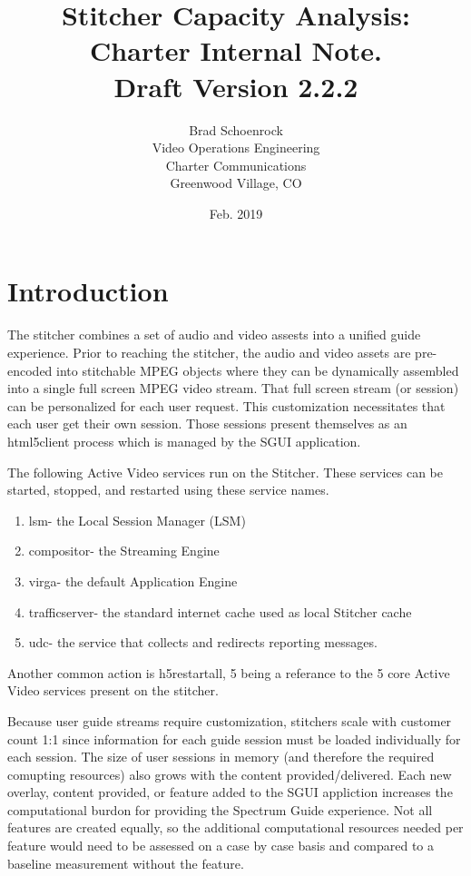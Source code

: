 \documentclass{article}
\author{Brad Schoenrock\\Video Operations Engineering\\Charter Communications\\Greenwood Village, CO}
\title{Stitcher Capacity Analysis:\\Charter Internal Note.\\Draft Version 2.2.2}
\date{Feb. 2019}
\begin{document}
\maketitle
\newpage

\tableofcontents
\newpage

\section{Introduction}
\label{SECTION-Introduction}

The stitcher combines a set of audio and video assests into a unified guide experience. Prior to reaching the stitcher, the audio and video assets are pre-encoded into stitchable MPEG objects where they can be dynamically assembled into a single full screen MPEG video stream. That full screen stream (or session) can be personalized for each user request. This customization necessitates that each user get their own session. Those sessions present themselves as an html5client process which is managed by the SGUI application. 

The following Active Video services run on the Stitcher. These services can be started, stopped, and restarted using these service names. 

\begin{enumerate}
\item lsm- the Local Session Manager (LSM)
\item compositor- the Streaming Engine
\item virga- the default Application Engine
\item trafficserver- the standard internet cache used as local Stitcher cache
\item udc- the service that collects and redirects reporting messages.
\end{enumerate}

Another common action is h5restartall, 5 being a referance to the 5 core Active Video services present on the stitcher.

Because user guide streams require customization, stitchers scale with customer count 1:1 since information for each guide session must be loaded individually for each session. The size of user sessions in memory (and therefore the required comupting resources) also grows with the content provided/delivered. Each new overlay, content provided, or feature added to the SGUI appliction increases the computational burdon for providing the Spectrum Guide experience. Not all features are created equally, so the additional computational resources needed per feature would need to be assessed on a case by case basis and compared to a baseline measurement without the feature. 
\end{document}
